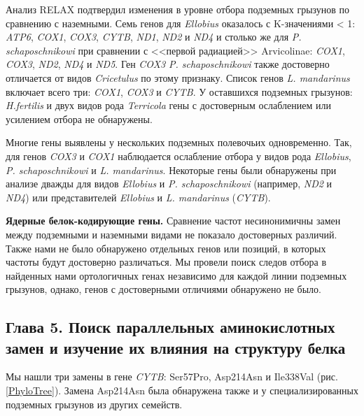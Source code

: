 Анализ RELAX подтвердил изменения в уровне отбора подземных грызунов по сравнению с наземными. Семь генов для \textit{Ellobius} оказалось с K-значениями < 1: \textit{ATP6}, \textit{COX1}, \textit{COX3}, \textit{CYTB}, \textit{ND1}, \textit{ND2} и \textit{ND4} и столько же для \textit{P. schaposchnikowi} при сравнении с <<первой радиацией>> Arvicolinae: \textit{COX1}, \textit{COX3}, \textit{ND2}, \textit{ND4} и \textit{ND5}. Ген \textit{COX3} \textit{P. schaposchnikowi} также достоверно отличается от видов \textit{Cricetulus} по этому признаку. Список генов \textit{L. mandarinus} включает всего три: \textit{COX1}, \textit{COX3} и \textit{CYTB}. У оставшихся подземных грызунов: \textit{H.fertilis} и двух видов рода \textit{Terricola} гены с достоверным ослаблением или усилением отбора не обнаружены.

Многие гены выявлены у нескольких подземных полевочьих одновременно. Так, для генов \textit{COX3} и \textit{COX1} наблюдается ослабление отбора у видов рода \textit{Ellobius}, \textit{P. schaposchnikowi} и \textit{L. mandarinus}. Некоторые гены были обнаружены при анализе дважды для видов \textit{Ellobius} и \textit{P. schaposchnikowi} (например, \textit{ND2} и \textit{ND4}) или представителей \textit{Ellobius} и \textit{L. mandarinus} (\textit{CYTB}).

\textbf{Ядерные белок-кодирующие гены.} Сравнение частот несинонимичны замен между подземными и наземными видами не показало достоверных различий. Также нами не было обнаружено отдельных генов  или позиций, в которых частоты будут достоверно различаться. Мы провели поиск следов отбора в найденных нами ортологичных генах независимо для каждой линии подземных грызунов, однако, генов с достоверными отличиями обнаружено не было. 
 
\subsection*{Глава 5. Поиск параллельных аминокислотных замен и изучение их влияния на структуру белка}

Мы нашли три замены в гене \textit{CYTB}: Ser57Pro, Asp214Asn и Ile338Val (рис. \ref{PhyloTree}). Замена Asp214Asn была обнаружена также и у специализированных подземных грызунов из других семейств.


